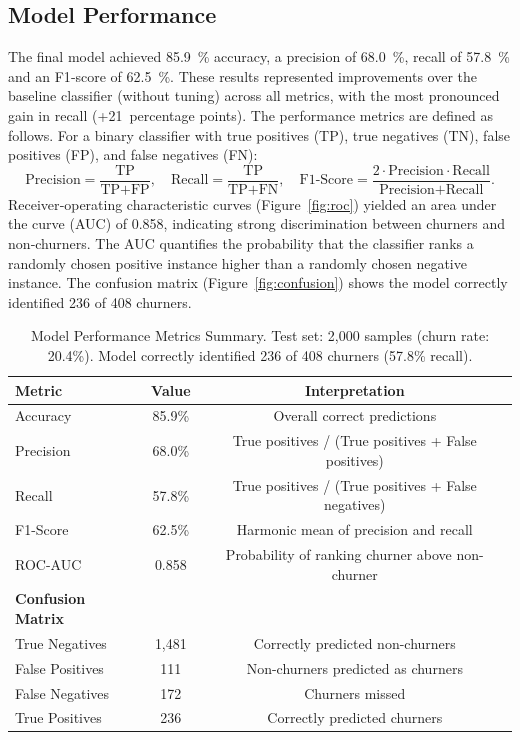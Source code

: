 \documentclass[12pt]{article}
\begin{document}
\subsection{Model Performance}
The final model achieved 85.9~\% accuracy, a precision of 68.0~\%, recall of 57.8~\% and an F1‑score of 62.5~\%.  These results represented improvements over the baseline classifier (without tuning) across all metrics, with the most pronounced gain in recall (+21~percentage points).  The performance metrics are defined as follows.  For a binary classifier with true positives (TP), true negatives (TN), false positives (FP), and false negatives (FN):
\[ \text{Precision} = \frac{\text{TP}}{\text{TP} + \text{FP}}, \quad \text{Recall} = \frac{\text{TP}}{\text{TP} + \text{FN}}, \quad \text{F1-Score} = \frac{2 \cdot \text{Precision} \cdot \text{Recall}}{\text{Precision} + \text{Recall}}. \]
Receiver‑operating characteristic curves (Figure~\ref{fig:roc}) yielded an area under the curve (AUC) of 0.858, indicating strong discrimination between churners and non‑churners.  The AUC quantifies the probability that the classifier ranks a randomly chosen positive instance higher than a randomly chosen negative instance.  The confusion matrix (Figure~\ref{fig:confusion}) shows the model correctly identified 236 of 408 churners.

\begin{table}[H]
\centering
\caption{Model Performance Metrics Summary. Test set: 2,000 samples (churn rate: 20.4\%). Model correctly identified 236 of 408 churners (57.8\% recall).}
\label{tab:model_performance}
\begin{tabular}{lcc}
\toprule
\textbf{Metric} & \textbf{Value} & \textbf{Interpretation} \\
\midrule
Accuracy & 85.9\% & Overall correct predictions \\
Precision & 68.0\% & True positives / (True positives + False positives) \\
Recall & 57.8\% & True positives / (True positives + False negatives) \\
F1-Score & 62.5\% & Harmonic mean of precision and recall \\
ROC-AUC & 0.858 & Probability of ranking churner above non-churner \\
\midrule
\textbf{Confusion Matrix} & & \\
\phantom{---} True Negatives & 1,481 & Correctly predicted non-churners \\
\phantom{---} False Positives & 111 & Non-churners predicted as churners \\
\phantom{---} False Negatives & 172 & Churners missed \\
\phantom{---} True Positives & 236 & Correctly predicted churners \\
\bottomrule
\end{tabular}
\end{table}
\end{document}
